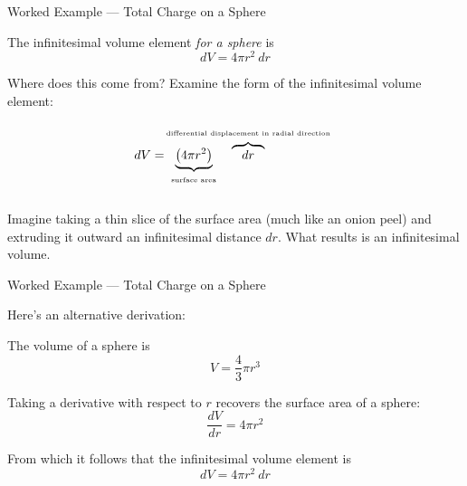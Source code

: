 \documentclass{beamer}
\begin{document}
\begin{frame}{Worked Example --- Total Charge on a Sphere}

The infinitesimal volume element \emph{for a sphere} is
\begin{equation*}
    dV = 4\pi r^2\ dr
\end{equation*}

Where does this come from? Examine the form of the infinitesimal volume element:
\begin{equation*}
    dV = \hspace{-0.02\textwidth} \underbrace{\left( 4\pi r^2 \right)}_{\parbox[c]{0.16\textwidth}{\tiny \vspace{-1em} \begin{center} surface area \end{center}}} \hspace{-0.16\textwidth} \overbrace{\hspace{0.8em}dr\hspace{0.8em}}^{\parbox[c]{0.4\textwidth}{\tiny \begin{center} differential displacement in radial direction \end{center}\vspace{-1em}}}
\end{equation*}

Imagine taking a thin slice of the surface area (much like an onion peel) and extruding it outward an infinitesimal distance $dr$. What results is an infinitesimal volume.

\end{frame}

\begin{frame}{Worked Example --- Total Charge on a Sphere}

Here's an alternative derivation:

\vfill

The volume of a sphere is
\begin{equation*}
    V = \frac{4}{3} \pi r^3
\end{equation*}

Taking a derivative with respect to $r$ recovers the surface area of a sphere:
\begin{equation*}
    \frac{dV}{dr} = 4\pi r^2
\end{equation*}

From which it follows that the infinitesimal volume element is
\begin{equation*}
    dV = 4\pi r^2\ dr
\end{equation*}

\end{frame}
\end{document}
